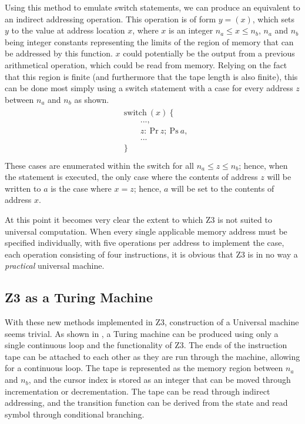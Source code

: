 \documentclass[Master.tex]{subfiles}
\begin{document}
Using this method to emulate switch statements, we can produce an equivalent to an indirect addressing operation. This operation is of form $y = (x)$, which sets $y$ to the value at address location $x$, where $x$ is an integer $n_a \leq x \leq n_b$, $n_a$ and $n_b$ being integer constants representing the limits of the region of memory that can be addressed by this function. $x$ could potentially be the output from a previous arithmetical operation, which could be read from memory. Relying on the fact that this region is finite (and furthermore that the tape length is also finite), this can be done most simply using a switch statement with a case for every address $z$ between $n_a$ and $n_b$ as shown.
\begin{gather*}
\begin{aligned}
&\bm{\mathrm{switch}}\ (x)\ \{              	\\
&\qquad ... ,                                   \\
&\qquad z:\	\mathrm{Pr}\ z;\ \mathrm{Ps}\ a,    \\
&\qquad ... 					                \\
&\}							                    \\
\end{aligned}
\end{gather*}
These cases are enumerated within the switch for all $n_a \leq z \leq n_b$; hence, when the statement is executed, the only case where the contents of address $z$ will be written to $a$ is the case where $x=z$; hence, $a$ will be set to the contents of address $x$.


At this point it becomes very clear the extent to which Z3 is not suited to universal computation. When every single applicable memory address must be specified individually, with five operations per address to implement the case, each operation consisting of four instructions, it is obvious that Z3 is in no way a \textit{practical} universal machine.

\subsection{Z3 as a Turing Machine}

With these new methods implemented in Z3, construction of a Universal machine seems trivial. As shown in \cite{harel1980folk}, a Turing machine can be produced using only a single continuous loop and the functionality of Z3. The ends of the instruction tape can be attached to each other as they are run through the machine, allowing for a continuous loop. The tape is represented as the memory region between $n_a$ and $n_b$, and the cursor index is stored as an integer that can be moved through incrementation or decrementation. The tape can be read through indirect addressing, and the transition function can be derived from the state and read symbol through conditional branching.
\end{document}
